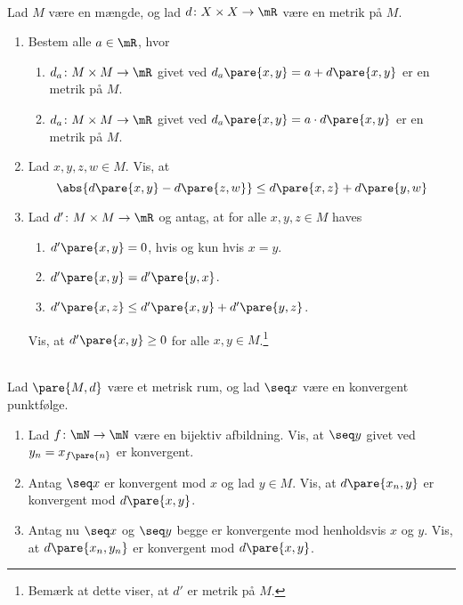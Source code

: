 \begin{opg}\hfill \\
Lad $M$ være en mængde, og lad $d\colon X\times X\to\mR$ være en metrik på $M$.
\begin{enumerate}
    \item Bestem alle $a\in\mR$, hvor
    \begin{enumerate}[label=\roman*)]
        \item $d_a\colon M\times M\to\mR$ givet ved $d_a\pare{x,y}=a+d\pare{x,y}$ er en metrik på $M$.
        
        \item $d_a\colon M\times M\to\mR$ givet ved $d_a\pare{x,y} = a\cdot d\pare{x,y}$ er en metrik på $M$.
    \end{enumerate}
    
    \item Lad $x,y,z,w\in M$. Vis, at
    $$ \abs{d\pare{x,y}-d\pare{z,w}} \leq d\pare{x,z} + d\pare{y,w} $$
    
    \item Lad $d'\colon M\times M\to\mR$ og antag, at for alle $x,y,z\in M$ haves
    \begin{enumerate}[label=(M\arabic*)]
        \item $d'\pare{x,y} = 0$, hvis og kun hvis $x = y$.
        \item $d'\pare{x,y} = d'\pare{y,x}$.
        \item $d'\pare{x,z} \leq d'\pare{x,y} + d'\pare{y,z}$.
    \end{enumerate}
    Vis, at $d'\pare{x,y}\geq 0$ for alle $x,y\in M$.\footnote{Bemærk at dette viser, at $d'$ er metrik på $M$.}
\end{enumerate}
\end{opg}

\begin{opg}[Følgekonvergens]\hfill \\
Lad $\pare{M,d}$ være et metrisk rum, og lad $\seq x$ være en konvergent punktfølge.
\begin{enumerate}
    \item Lad $f\colon\mN\to\mN$ være en bijektiv afbildning. Vis, at $\seq y$ givet ved $y_n = x_{f\pare{n}}$ er konvergent.
    
    \item Antag $\seq x$ er konvergent mod $x$ og lad $y\in M$. Vis, at $d\pare{x_n,y}$ er konvergent mod $d\pare{x,y}$.
    \item Antag nu $\seq x$ og $\seq y$ begge er konvergente mod henholdsvis $x$ og $y$. Vis, at $d\pare{x_n,y_n}$ er konvergent mod $d\pare{x,y}$.
\end{enumerate}
\end{opg}

